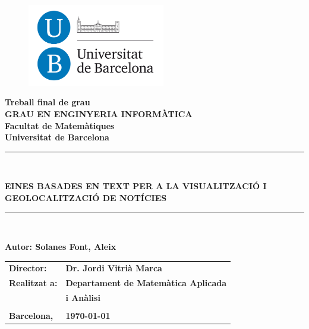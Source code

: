 \documentclass[12pt,a4paper,openright,oneside]{article}
\numberwithin{equation}{section}
\theoremstyle{definition}
\begin{document}

\thispagestyle{empty}

\begin{titlepage}
\begin{center}
\begin{figure}[htb]
\begin{center}
\includegraphics[width=6cm]{ub.png}
\end{center}
\end{figure}

\textbf{\LARGE Treball final de grau} \\
\vspace*{.5cm}
\textbf{\LARGE GRAU EN ENGINYERIA INFORMÀTICA } \\
\vspace*{.5cm}
\textbf{\LARGE Facultat de Matemàtiques \\ Universitat de Barcelona} \\
\vspace*{1.5cm}
\rule{16cm}{0.1mm}\\
\begin{Huge}
\textbf{EINES BASADES EN TEXT PER A LA VISUALITZACIÓ I GEOLOCALITZACIÓ DE NOTÍCIES} \\
\end{Huge}
\rule{16cm}{0.1mm}\\

\vspace{1cm}

\begin{flushright}
\textbf{\LARGE Autor: Solanes Font, Aleix}

\vspace*{2cm}

\renewcommand{\arraystretch}{1.5}
\begin{tabular}{ll}
\textbf{\Large Director:} & \textbf{\Large Dr. Jordi Vitrià Marca} \\
\textbf{\Large Realitzat a:} & \textbf{\Large  Departament de Matemàtica Aplicada    } \\
 & \textbf{\Large i Anàlisi} \\
\\
\textbf{\Large Barcelona,} & \textbf{\Large \today }
\end{tabular}

\end{flushright}

\end{center}










\end{titlepage}
\end{document}

